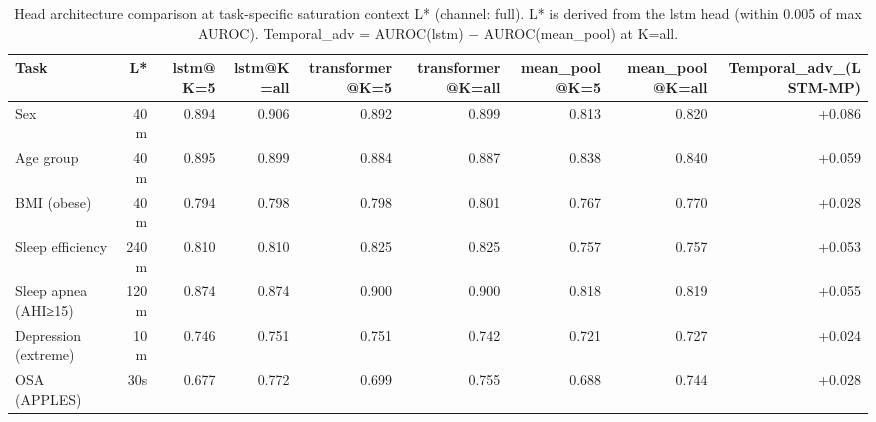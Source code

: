 \begin{table}[ht]
\centering
\caption{Head architecture comparison at task-specific saturation context L* (channel: full). L* is derived from the lstm head (within 0.005 of max AUROC). Temporal\_adv = AUROC(lstm) − AUROC(mean\_pool) at K=all.}
\label{tab:heads_full}
\begin{tabular}{lrrrrrrrr}
\toprule
Task & L* & lstm@K=5 & lstm@K=all & transformer@K=5 & transformer@K=all & mean_pool@K=5 & mean_pool@K=all & Temporal_adv_(LSTM-MP) \\
\midrule
Sex & 40m & 0.894 & 0.906 & 0.892 & 0.899 & 0.813 & 0.820 & +0.086 \\
Age group & 40m & 0.895 & 0.899 & 0.884 & 0.887 & 0.838 & 0.840 & +0.059 \\
BMI (obese) & 40m & 0.794 & 0.798 & 0.798 & 0.801 & 0.767 & 0.770 & +0.028 \\
Sleep efficiency & 240m & 0.810 & 0.810 & 0.825 & 0.825 & 0.757 & 0.757 & +0.053 \\
Sleep apnea (AHI≥15) & 120m & 0.874 & 0.874 & 0.900 & 0.900 & 0.818 & 0.819 & +0.055 \\
Depression (extreme) & 10m & 0.746 & 0.751 & 0.751 & 0.742 & 0.721 & 0.727 & +0.024 \\
OSA (APPLES) & 30s & 0.677 & 0.772 & 0.699 & 0.755 & 0.688 & 0.744 & +0.028 \\
\bottomrule
\end{tabular}
\end{table}